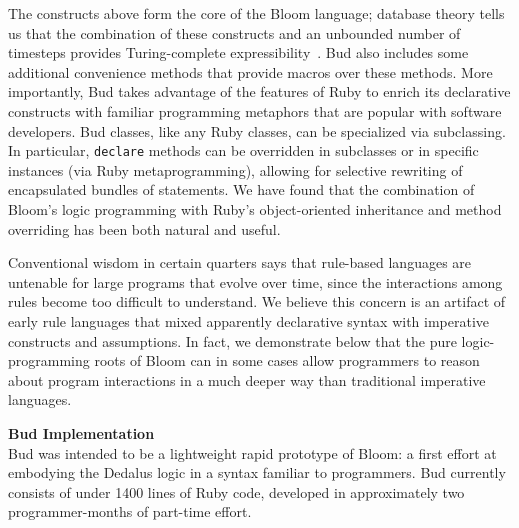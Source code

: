 The constructs above form the core of the Bloom language; database theory tells us that the combination of these constructs and an unbounded number of timesteps provides Turing-complete expressibility~\cite{Papadimitriou85}.  
Bud also includes some additional convenience methods that provide macros over these methods.  More importantly, Bud takes advantage of the features of Ruby to enrich its declarative constructs with familiar programming metaphors that are popular with software developers.  Bud classes, like any Ruby classes, can be specialized via subclassing.  In particular, \texttt{declare} methods can be overridden in subclasses or in specific instances (via Ruby metaprogramming), allowing for selective rewriting of encapsulated bundles of statements.  We have found that the combination of Bloom's logic programming with Ruby's object-oriented inheritance and method overriding has been both natural and useful.

Conventional wisdom in certain quarters says that rule-based languages are untenable for large programs that evolve over time, since the interactions among rules become too difficult to understand.  We believe this concern is an artifact of early rule languages that mixed apparently declarative syntax with imperative constructs and assumptions.  In fact, we demonstrate below that the pure logic-programming roots of Bloom can in some cases allow programmers to reason about program interactions in a much deeper way than traditional imperative languages.

\textbf{Bud Implementation}\\
Bud was intended to be a lightweight rapid prototype of Bloom: a first effort at embodying the Dedalus logic in a syntax familiar to programmers.  Bud currently consists of under 1400 lines of Ruby code, developed in approximately two programmer-months of part-time effort.

